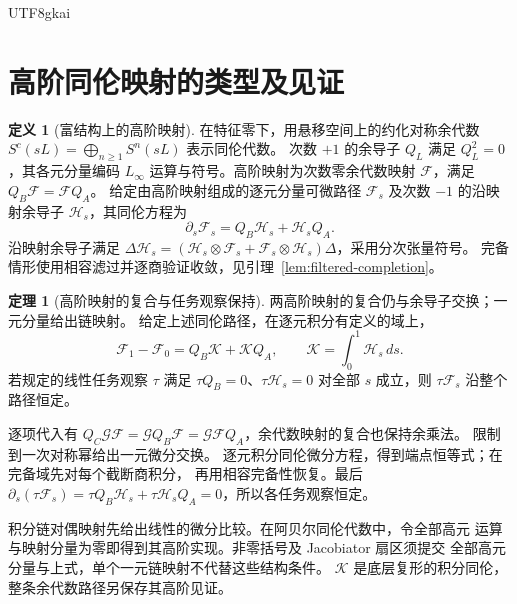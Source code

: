 \documentclass[12pt]{report}
\makeatletter
\theoremstyle{definition}
\newtheorem{definition}{定义}[chapter]
\newtheorem{theorem}{定理}[chapter]
\renewenvironment{proof}[1][\proofname]{\par
  \pushQED{\qed}\normalfont
  \topsep6\p@\@plus6\p@\relax
  \trivlist
  \item[\hskip\labelsep\normalfont #1\@addpunct{.}]\ignorespaces
}{
  \popQED\endtrivlist\@endpefalse
}
\makeatother
\begin{document}
\begin{CJK*}{UTF8}{gkai}
\section{高阶同伦映射的类型及见证}
\begin{definition}[富结构上的高阶映射]
\label{def:higher-comparison}
在特征零下，用悬移空间上的约化对称余代数
\(S^c(sL)=\bigoplus_{n\ge1}S^n(sL)\) 表示同伦代数。
次数 \(+1\) 的余导子 \(Q_L\) 满足 \(Q_L^2=0\)，其各元分量编码
\(L_\infty\) 运算与符号。高阶映射为次数零余代数映射 \(\mathcal F\)，满足
\(Q_B\mathcal F=\mathcal FQ_A\)。
给定由高阶映射组成的逐元分量可微路径 \(\mathcal F_s\) 及次数 \(-1\) 的沿映射余导子
\(\mathcal H_s\)，其同伦方程为
\[
\partial_s\mathcal F_s=Q_B\mathcal H_s+\mathcal H_sQ_A.
\]
沿映射余导子满足
\(\Delta\mathcal H_s=(\mathcal H_s\otimes\mathcal F_s+
\mathcal F_s\otimes\mathcal H_s)\Delta\)，采用分次张量符号。
完备情形使用相容滤过并逐商验证收敛，见引理~\ref{lem:filtered-completion}。
\end{definition}
\begin{theorem}[高阶映射的复合与任务观察保持]
\label{thm:higher-comparison}
两高阶映射的复合仍与余导子交换；一元分量给出链映射。
给定上述同伦路径，在逐元积分有定义的域上，
\[
\mathcal F_1-\mathcal F_0=Q_B\mathcal K+\mathcal KQ_A,
\qquad \mathcal K=\int_0^1\mathcal H_s\,ds.
\]
若规定的线性任务观察 \(\tau\) 满足
\(\tau Q_B=0\)、\(\tau\mathcal H_s=0\) 对全部 \(s\) 成立，则
\(\tau\mathcal F_s\) 沿整个路径恒定。
\end{theorem}
\begin{proof}
逐项代入有
\(Q_C\mathcal G\mathcal F=\mathcal GQ_B\mathcal F
=\mathcal G\mathcal FQ_A\)，余代数映射的复合也保持余乘法。
限制到一次对称幂给出一元微分交换。
逐元积分同伦微分方程，得到端点恒等式；在完备域先对每个截断商积分，
再用相容完备性恢复。最后
\(\partial_s(\tau\mathcal F_s)=\tau Q_B\mathcal H_s+
\tau\mathcal H_sQ_A=0\)，所以各任务观察恒定。
\end{proof}
积分链对偶映射先给出线性的微分比较。在阿贝尔同伦代数中，令全部高元
运算与映射分量为零即得到其高阶实现。非零括号及 Jacobiator 扇区须提交
全部高元分量与上式，单个一元链映射不代替这些结构条件。
\(\mathcal K\) 是底层复形的积分同伦，整条余代数路径另保存其高阶见证。


\end{CJK*}
\end{document}
